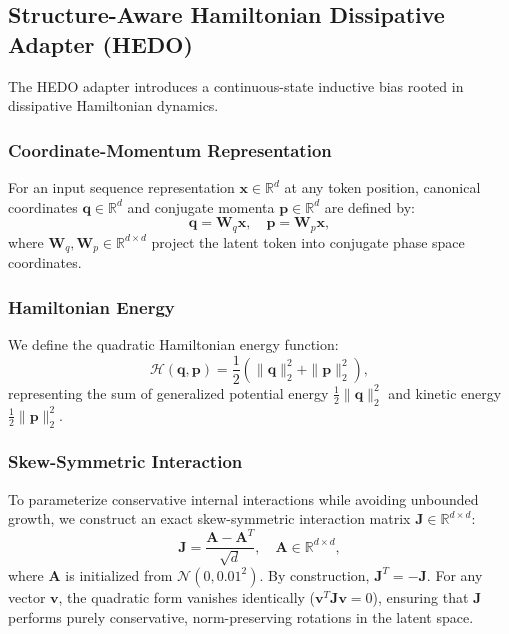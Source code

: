 \documentclass[conference]{IEEEtran}
\begin{document}
\subsection{Structure-Aware Hamiltonian Dissipative Adapter (HEDO)}
The HEDO adapter introduces a continuous-state inductive bias rooted in dissipative Hamiltonian dynamics.

\subsubsection{Coordinate-Momentum Representation}
For an input sequence representation $\mathbf{x} \in \mathbb{R}^d$ at any token position, canonical coordinates $\mathbf{q} \in \mathbb{R}^d$ and conjugate momenta $\mathbf{p} \in \mathbb{R}^d$ are defined by:
\begin{equation}
\label{eq:hedo_qp}
\mathbf{q} = \mathbf{W}_q \mathbf{x}, \quad \mathbf{p} = \mathbf{W}_p \mathbf{x},
\end{equation}
where $\mathbf{W}_q, \mathbf{W}_p \in \mathbb{R}^{d \times d}$ project the latent token into conjugate phase space coordinates.

\subsubsection{Hamiltonian Energy}
We define the quadratic Hamiltonian energy function:
\begin{equation}
\label{eq:hamiltonian}
\mathcal{H}(\mathbf{q}, \mathbf{p}) = \frac{1}{2} \left( \|\mathbf{q}\|_2^2 + \|\mathbf{p}\|_2^2 \right),
\end{equation}
representing the sum of generalized potential energy $\frac{1}{2}\|\mathbf{q}\|_2^2$ and kinetic energy $\frac{1}{2}\|\mathbf{p}\|_2^2$.

\subsubsection{Skew-Symmetric Interaction}
To parameterize conservative internal interactions while avoiding unbounded growth, we construct an exact skew-symmetric interaction matrix $\mathbf{J} \in \mathbb{R}^{d \times d}$:
\begin{equation}
\label{eq:skew_symmetric}
\mathbf{J} = \frac{\mathbf{A} - \mathbf{A}^T}{\sqrt{d}}, \quad \mathbf{A} \in \mathbb{R}^{d \times d},
\end{equation}
where $\mathbf{A}$ is initialized from $\mathcal{N}(0, 0.01^2)$. By construction, $\mathbf{J}^T = -\mathbf{J}$. For any vector $\mathbf{v}$, the quadratic form vanishes identically ($\mathbf{v}^T \mathbf{J} \mathbf{v} = 0$), ensuring that $\mathbf{J}$ performs purely conservative, norm-preserving rotations in the latent space.
\end{document}
